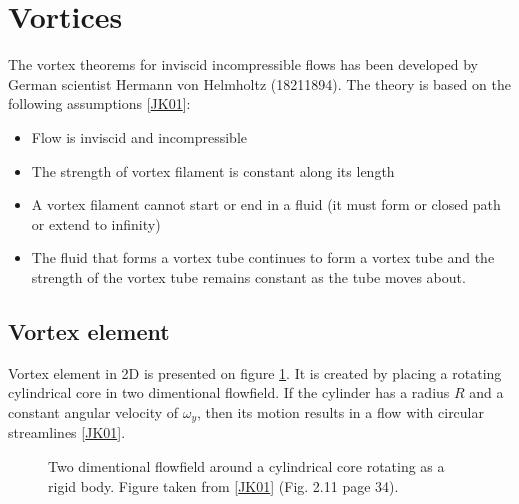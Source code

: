 \documentclass[letterpaper,10pt,english]{jupyterBook}
\begin{document}
\section{Vortices}
\label{\detokenize{chapters/description/theory:vortices}}
\sphinxAtStartPar
The vortex theorems for inviscid incompressible flows has been developed by German scientist Hermann von Helmholtz (1821\sphinxhyphen{}1894). The theory is based on the following assumptions {[}\hyperlink{cite.chapters/bibliography:id4}{JK01}{]}:
\begin{itemize}
\item {} 
\sphinxAtStartPar
Flow is inviscid and incompressible

\item {} 
\sphinxAtStartPar
The strength of vortex filament is constant along its length

\item {} 
\sphinxAtStartPar
A vortex filament cannot start or end in a fluid (it must form or closed path or extend to infinity)

\item {} 
\sphinxAtStartPar
The fluid that forms a vortex tube continues to form a vortex tube and the strength of the vortex tube remains constant as the tube moves about.

\end{itemize}


\subsection{Vortex element}
\label{\detokenize{chapters/description/theory:vortex-element}}
\sphinxAtStartPar
Vortex element in 2D is presented on figure \hyperref[\detokenize{chapters/description/theory:vortex}]{\ref{\detokenize{chapters/description/theory:vortex}}}. It is created by placing a rotating cylindrical core in two dimentional flowfield. If the cylinder has a radius \(R\) and a constant angular velocity of \(\omega_y\), then its motion results in a flow with circular streamlines {[}\hyperlink{cite.chapters/bibliography:id4}{JK01}{]}.

\begin{figure}[htbp]
\centering
\capstart

\noindent{}
\caption{Two dimentional flowfield around a cylindrical core rotating as a rigid body. Figure taken from {[}\hyperlink{cite.chapters/bibliography:id4}{JK01}{]} (Fig. 2.11 page 34).}\label{\detokenize{chapters/description/theory:vortex}}\end{figure}
\end{document}
